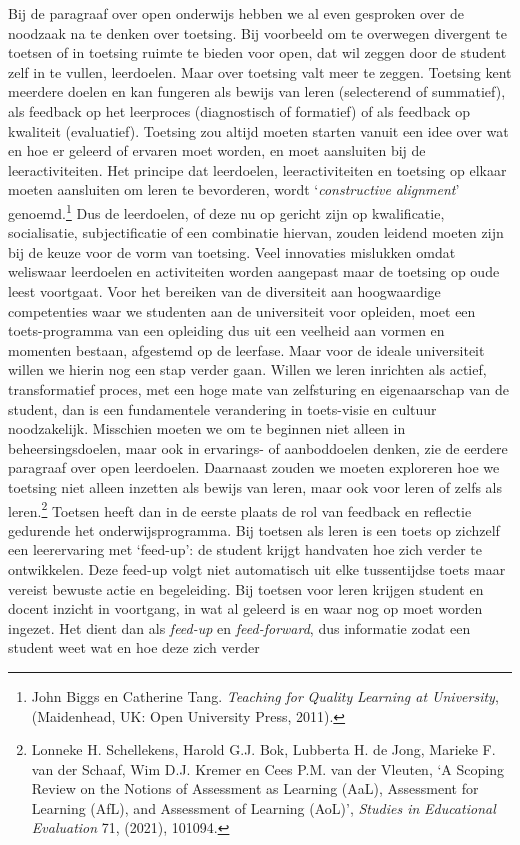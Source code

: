 \documentclass[smallauthor, chapterhaspagenum, nochapterinheader, pagenuminheader,  bigchapnum,medium2, tocpages,  garamond, titleinheader]{jote-book}
\begin{document}
	Bij de paragraaf over open onderwijs hebben we al even gesproken over de noodzaak na te denken over toetsing. Bij voorbeeld om te overwegen divergent te toetsen of in toetsing ruimte te bieden voor open, dat wil zeggen door de student zelf in te vullen, leerdoelen. Maar over toetsing valt meer te zeggen. Toetsing kent meerdere doelen en kan fungeren als bewijs van leren (selecterend of summatief), als feedback op het leerproces (diagnostisch of formatief) of als feedback op kwaliteit (evaluatief). Toetsing zou altijd moeten starten vanuit een idee over wat en hoe er geleerd of ervaren moet worden, en moet aansluiten bij de leeractiviteiten. Het principe dat leerdoelen, leeractiviteiten en toetsing op elkaar moeten aansluiten om leren te bevorderen, wordt ‘\emph{constructive}\emph{ }\emph{alignment}' genoemd.\footnote{John Biggs en Catherine Tang. \emph{Teaching }\emph{for}\emph{ }\emph{Quality}\emph{ Learning at University}, (Maidenhead, UK: Open University Press, 2011).} Dus de leerdoelen, of deze nu op gericht zijn op kwalificatie, socialisatie, subjectificatie of een combinatie hiervan, zouden leidend moeten zijn bij de keuze voor de vorm van toetsing. Veel innovaties mislukken omdat weliswaar leerdoelen en activiteiten worden aangepast maar de toetsing op oude leest voortgaat. Voor het bereiken van de diversiteit aan hoogwaardige competenties waar we studenten aan de universiteit voor opleiden, moet een toets-programma van een opleiding dus uit een veelheid aan vormen en momenten bestaan, afgestemd op de leerfase. Maar voor de ideale universiteit willen we hierin nog een stap verder gaan. Willen we leren inrichten als actief, transformatief proces, met een hoge mate van zelfsturing en eigenaarschap van de student, dan is een fundamentele verandering in toets-visie en cultuur noodzakelijk. Misschien moeten we om te beginnen niet alleen in beheersingsdoelen, maar ook in ervarings- of aanboddoelen denken, zie de eerdere paragraaf over open leerdoelen. Daarnaast zouden we moeten exploreren hoe we toetsing niet alleen inzetten als bewijs van leren, maar ook voor leren of zelfs als leren.\footnote{Lonneke H. Schellekens, Harold G.J. Bok, Lubberta H. de Jong, Marieke F. van der Schaaf, Wim D.J. Kremer en Cees P.M. van der Vleuten, ‘A Scoping Review on the Notions of Assessment as Learning (AaL), Assessment for Learning (AfL), and Assessment of Learning (AoL)', \emph{Studies in }\emph{Educational}\emph{ Evaluation} 71, (2021), 101094.} Toetsen heeft dan in de eerste plaats de rol van feedback en reflectie gedurende het onderwijsprogramma. Bij toetsen als leren is een toets op zichzelf een leerervaring met ‘feed-up': de student krijgt handvaten hoe zich verder te ontwikkelen. Deze feed-up volgt niet automatisch uit elke tussentijdse toets maar vereist bewuste actie en begeleiding. Bij toetsen voor leren krijgen student en docent inzicht in voortgang, in wat al geleerd is en waar nog op moet worden ingezet. Het dient dan als \emph{feed-up} en \emph{feed-forward}, dus informatie zodat een student weet wat en hoe deze zich verder 
\end{document}
